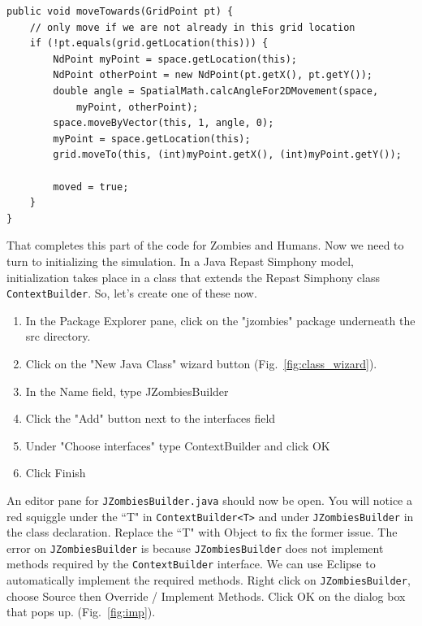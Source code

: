 \documentclass[11pt]{amsart}
\begin{document}
\noindent\begin{minipage}[h]{\textwidth}
\vspace{.2in}
\lstset{language=java,caption=Zombie MovedTowards with Moved}
\begin{lstlisting}
public void moveTowards(GridPoint pt) {
	// only move if we are not already in this grid location
	if (!pt.equals(grid.getLocation(this))) {
		NdPoint myPoint = space.getLocation(this);
		NdPoint otherPoint = new NdPoint(pt.getX(), pt.getY());
		double angle = SpatialMath.calcAngleFor2DMovement(space, 
			myPoint, otherPoint);
		space.moveByVector(this, 1, angle, 0);
		myPoint = space.getLocation(this);
		grid.moveTo(this, (int)myPoint.getX(), (int)myPoint.getY());
		
		moved = true;
	}
}
\end{lstlisting}
\vspace{.2in}
\end{minipage}

That completes this part of the code for Zombies and Humans. Now we need to turn to initializing the simulation. In a Java Repast Simphony model, initialization takes place in a class that extends the Repast Simphony class \texttt{ContextBuilder}. So, let's create one of these now.\\

\begin{enumerate}
\item In the Package Explorer pane, click on the "jzombies" package underneath the src directory. 
\item Click on the "New Java Class" wizard button (Fig.~\ref{fig:class_wizard}).
\item In the Name field, type JZombiesBuilder
\item Click the "Add" button next to the interfaces field
\item Under "Choose interfaces" type ContextBuilder and click OK
\item Click Finish
\end{enumerate}

\vspace{.2in}
An editor pane for \texttt{JZombiesBuilder.java} should now be open. You will notice a red squiggle under the ``T" in \texttt{ContextBuilder<T>} and under \texttt{JZombiesBuilder} in the class declaration. Replace the ``T" with Object to fix the former issue. The error on \texttt{JZombiesBuilder} is because \texttt{JZombiesBuilder} does not implement methods required by the \texttt{ContextBuilder} interface. We can use Eclipse to automatically implement the required methods. Right click on \texttt{JZombiesBuilder}, choose Source then Override / Implement Methods. Click OK on the dialog box that pops up.  (Fig.~\ref{fig:imp}).
\end{document}
